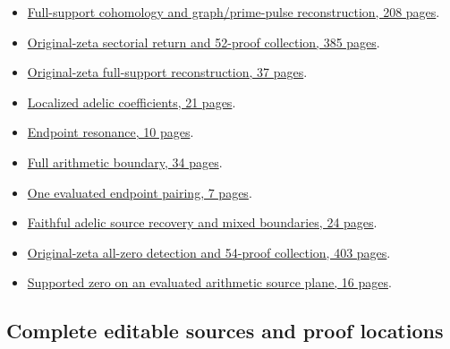 \documentclass[
]{article}
\providecommand{\tightlist}{%
  \setlength{\itemsep}{0pt}\setlength{\parskip}{0pt}}
\begin{document}
\begin{itemize}
\tightlist
\item
  \href{https://zenodo.org/records/22920941/files/001-splitzero-full-support-cohomology.pdf?download=1}{Full-support
  cohomology and graph/prime-pulse reconstruction, 208 pages}.
\item
  \href{https://zenodo.org/records/22920941/files/002-splitzero-original-zeta-sectorial-return.pdf?download=1}{Original-zeta
  sectorial return and 52-proof collection, 385 pages}.
\item
  \href{https://zenodo.org/records/22920941/files/003-splitzero-original-zeta-full-support.pdf?download=1}{Original-zeta
  full-support reconstruction, 37 pages}.
\item
  \href{https://zenodo.org/records/22920941/files/004-splitzero-localized-adelic-coefficients.pdf?download=1}{Localized
  adelic coefficients, 21 pages}.
\item
  \href{https://zenodo.org/records/22920941/files/005-splitzero-endpoint-resonance.pdf?download=1}{Endpoint
  resonance, 10 pages}.
\item
  \href{https://zenodo.org/records/22920941/files/006-splitzero-full-arithmetic-boundary.pdf?download=1}{Full
  arithmetic boundary, 34 pages}.
\item
  \href{https://zenodo.org/records/22920941/files/007-splitzero-evaluated-endpoint-pairing.pdf?download=1}{One
  evaluated endpoint pairing, 7 pages}.
\item
  \href{https://zenodo.org/records/22920941/files/010-splitzero-adelic-source-recovery.pdf?download=1}{Faithful
  adelic source recovery and mixed boundaries, 24 pages}.
\item
  \href{https://zenodo.org/records/22920941/files/013-splitzero-original-zeta-endpoint-detection.pdf?download=1}{Original-zeta
  all-zero detection and 54-proof collection, 403 pages}.
\item
  \href{https://zenodo.org/records/22920941/files/014-splitzero-supported-zero-source-plane.pdf?download=1}{Supported
  zero on an evaluated arithmetic source plane, 16 pages}.
\end{itemize}

\subsection{Complete editable sources and proof
locations}\label{complete-editable-sources-and-proof-locations}
\end{document}
